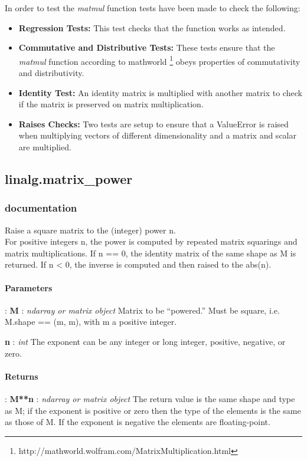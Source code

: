 \documentclass[a4paper,11pt]{article}
\begin{document}
In order to test the \textit{matmul} function tests have been made to check the following:

\begin{itemize}
	\item \textbf{Regression Tests:} This test checks that the function works as intended.
	\item \textbf{Commutative and Distributive Tests:}  These tests ensure that the \textit{matmul} function according to mathworld \footnote{http://mathworld.wolfram.com/MatrixMultiplication.html} obeys properties of commutativity and distributivity.
	\item \textbf{Identity Test:} An identity matrix is multiplied with another matrix to check if the matrix is preserved on matrix multiplication.
	\item \textbf{Raises Checks:} Two tests are setup to ensure that a ValueError is raised when multiplying vectors of different dimensionality and a matrix and scalar are multiplied.
\end{itemize}


\subsection{linalg.matrix\_power}
\subsubsection{documentation}
Raise a square matrix to the (integer) power n.\\ For positive integers n, the power is computed by repeated matrix squarings and matrix multiplications. If n == 0, the identity matrix of the same shape as M is returned. If n < 0, the inverse is computed and then raised to the abs(n).


\paragraph{Parameters}: \textbf{M} : \textit{ndarray or matrix object} Matrix to be “powered.” Must be square, i.e. M.shape == (m, m), with m a positive integer.

\textbf{n} : \textit{int} The exponent can be any integer or long integer, positive, negative, or zero.

\paragraph{Returns}: \textbf{M**n} : \textit{ndarray or matrix object} The return value is the same shape and type as M; if the exponent is positive or zero then the type of the elements is the same as those of M. If the exponent is negative the elements are floating-point.
\end{document}
